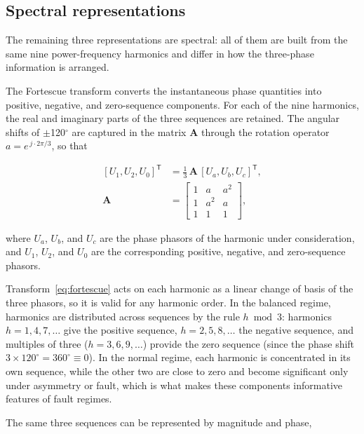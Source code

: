 \documentclass{ieeeojies}
\begin{document}
\subsection{Spectral representations}

The remaining three representations are spectral: all of them are built from the same nine power-frequency harmonics and differ in how the three-phase information is arranged.

The Fortescue transform converts the instantaneous phase quantities into positive, negative, and zero-sequence components. For each of the nine harmonics, the real and imaginary parts of the three sequences are retained. The angular shifts of $\pm$120$^\circ$ are captured in the matrix $\mathbf{A}$ through the rotation operator $a = e^{\,j\cdot 2\pi/3}$, so that

\begin{equation}
\begin{aligned}
{[U_1, U_2, U_0]}^{\mathsf{T}} &= \tfrac{1}{3}\,\mathbf{A}\,[U_a, U_b, U_c]^{\mathsf{T}},\\[2pt]
\mathbf{A} &= \begin{bmatrix}1 & a & a^2\\ 1 & a^2 & a\\ 1 & 1 & 1\end{bmatrix},
\end{aligned}
\label{eq:fortescue}
\end{equation}

where $U_a$, $U_b$, and $U_c$ are the phase phasors of the harmonic under consideration, and $U_1$, $U_2$, and $U_0$ are the corresponding positive, negative, and zero-sequence phasors.

Transform~\eqref{eq:fortescue} acts on each harmonic as a linear change of basis of the three phasors, so it is valid for any harmonic order. In the balanced regime, harmonics are distributed across sequences by the rule $h \bmod 3$: harmonics $h = 1, 4, 7, \ldots$ give the positive sequence, $h = 2, 5, 8, \ldots$ the negative sequence, and multiples of three ($h = 3, 6, 9, \ldots$) provide the zero sequence (since the phase shift $3\times 120^\circ = 360^\circ \equiv 0$). In the normal regime, each harmonic is concentrated in its own sequence, while the other two are close to zero and become significant only under asymmetry or fault, which is what makes these components informative features of fault regimes.

The same three sequences can be represented by magnitude and phase,
\end{document}
